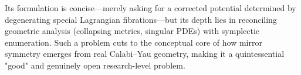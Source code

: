 Its formulation is concise—merely asking for a corrected potential determined by degenerating special Lagrangian fibrations—but its depth lies in reconciling geometric analysis (collapsing metrics, singular PDEs) with symplectic enumeration. Such a problem cuts to the conceptual core of how mirror symmetry emerges from real Calabi–Yau geometry, making it a quintessential "good" and genuinely open research-level problem.